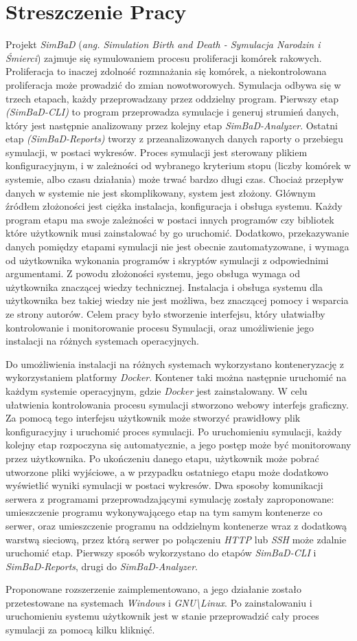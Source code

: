\chapter*{Streszczenie Pracy}\mbox{}
Projekt \textit{SimBaD} (\textit{ang. Simulation Birth and Death - Symulacja Narodzin i Śmierci}) zajmuje się symulowaniem procesu proliferacji komórek rakowych. Proliferacja to inaczej zdolność rozmnażania się komórek, a niekontrolowana proliferacja może prowadzić do zmian nowotworowych.
Symulacja odbywa się w trzech etapach, każdy przeprowadzany przez oddzielny program. Pierwszy etap \textit{(SimBaD-CLI)} to program przeprowadza symulacje i generuj strumień danych, który jest następnie analizowany przez kolejny etap \textit{SimBaD-Analyzer}. Ostatni etap \textit{(SimBaD-Reports)} tworzy z przeanalizowanych danych raporty o przebiegu symulacji, w postaci wykresów. Proces symulacji jest sterowany plikiem konfiguracyjnym, i w zależności od wybranego kryterium stopu  (liczby komórek w systemie, albo czasu działania) może trwać bardzo długi czas. Chociaż przepływ danych w systemie nie jest skomplikowany, system jest złożony. Głównym źródłem złożoności jest ciężka instalacja, konfiguracja i obsługa systemu. Każdy program etapu ma swoje zależności w postaci innych programów czy bibliotek które użytkownik musi zainstalować by go uruchomić. Dodatkowo, przekazywanie danych pomiędzy etapami symulacji nie jest obecnie zautomatyzowane, i wymaga od użytkownika wykonania programów i skryptów symulacji z odpowiednimi argumentami. Z powodu złożoności systemu, jego obsługa wymaga od użytkownika znaczącej wiedzy technicznej. Instalacja i obsługa systemu dla użytkownika bez takiej wiedzy nie jest możliwa, bez znaczącej pomocy i wsparcia ze strony autorów. Celem pracy było stworzenie interfejsu, który ułatwiałby kontrolowanie i monitorowanie procesu Symulacji, oraz umożliwienie jego instalacji na różnych systemach operacyjnych.

Do umożliwienia instalacji na różnych systemach wykorzystano konteneryzację z wykorzystaniem platformy \textit{Docker}. Kontener taki można następnie uruchomić na każdym systemie operacyjnym, gdzie \textit{Docker} jest zainstalowany. 
W celu ułatwienia kontrolowania procesu symulacji stworzono webowy interfejs graficzny. Za pomocą tego interfejsu użytkownik może stworzyć prawidłowy plik konfiguracyjny i uruchomić proces symulacji. Po uruchomieniu symulacji, każdy kolejny etap rozpoczyna się automatycznie, a jego postęp może być monitorowany przez użytkownika. Po ukończeniu danego etapu, użytkownik może pobrać utworzone pliki wyjściowe, a w przypadku ostatniego etapu może dodatkowo wyświetlić wyniki symulacji w postaci wykresów. Dwa sposoby komunikacji serwera z programami przeprowadzającymi symulację zostały zaproponowane: umieszczenie programu  wykonywającego etap na tym samym kontenerze co serwer, oraz umieszczenie programu na oddzielnym kontenerze wraz z dodatkową warstwą sieciową, przez którą serwer po połączeniu \textit{HTTP} lub \textit{SSH} może zdalnie uruchomić etap. Pierwszy sposób wykorzystano do etapów \textit{SimBaD-CLI} i \textit{SimBaD-Reports}, drugi do \textit{SimBaD-Analyzer}. 

Proponowane rozszerzenie zaimplementowano, a jego działanie zostało przetestowane na systemach \textit{Windows} i \textit{GNU\textbackslash Linux}. Po zainstalowaniu i uruchomieniu systemu użytkownik jest w stanie przeprowadzić cały proces symulacji za pomocą kilku kliknięć.